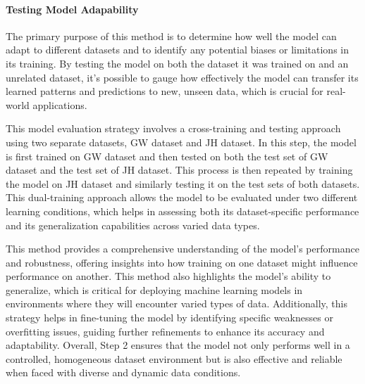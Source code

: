 \paragraph*{Testing Model Adapability}
\label{par:4_testing_model_adapability}
The primary purpose of this method is to determine how well the model can adapt to different datasets and to identify any potential biases or limitations in its training. By testing the model on both the dataset it was trained on and an unrelated dataset, it's possible to gauge how effectively the model can transfer its learned patterns and predictions to new, unseen data, which is crucial for real-world applications.

This model evaluation strategy involves a cross-training and testing approach using two separate datasets, GW dataset and JH dataset. In this step, the model is first trained on GW dataset and then tested on both the test set of GW dataset and the test set of JH dataset. This process is then repeated by training the model on JH dataset and similarly testing it on the test sets of both datasets. This dual-training approach allows the model to be evaluated under two different learning conditions, which helps in assessing both its dataset-specific performance and its generalization capabilities across varied data types.

This method provides a comprehensive understanding of the model’s performance and robustness, offering insights into how training on one dataset might influence performance on another. This method also highlights the model's ability to generalize, which is critical for deploying machine learning models in environments where they will encounter varied types of data. Additionally, this strategy helps in fine-tuning the model by identifying specific weaknesses or overfitting issues, guiding further refinements to enhance its accuracy and adaptability. Overall, Step 2 ensures that the model not only performs well in a controlled, homogeneous dataset environment but is also effective and reliable when faced with diverse and dynamic data conditions.
